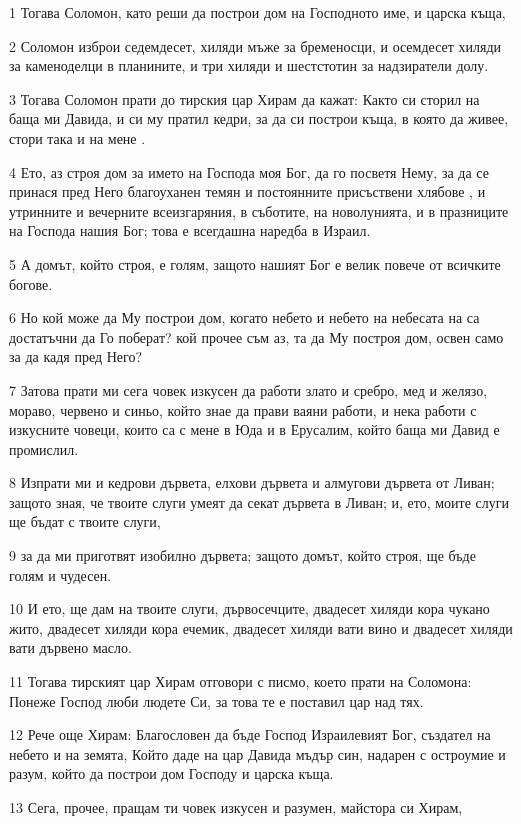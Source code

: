 \par 1 Тогава Соломон, като реши да построи дом на Господното име, и царска къща,
\par 2 Соломон изброи седемдесет, хиляди мъже за бременосци, и осемдесет хиляди за каменоделци в планините, и три хиляди и шестстотин за надзиратели долу.
\par 3 Тогава Соломон прати до тирския цар Хирам да кажат: Както си сторил на баща ми Давида, и си му пратил кедри, за да си построи къща, в която да живее, стори така и на мене .
\par 4 Ето, аз строя дом за името на Господа моя Бог, да го посветя Нему, за да се принася пред Него благоуханен темян и постоянните присъствени хлябове , и утринните и вечерните всеизгаряния, в съботите, на новолунията, и в празниците на Господа нашия Бог; това е всегдашна наредба в Израил.
\par 5 А домът, който строя, е голям, защото нашият Бог е велик повече от всичките богове.
\par 6 Но кой може да Му построи дом, когато небето и небето на небесата на са достатъчни да Го поберат? кой прочее съм аз, та да Му построя дом, освен само за да кадя пред Него?
\par 7 Затова прати ми сега човек изкусен да работи злато и сребро, мед и желязо, мораво, червено и синьо, който знае да прави ваяни работи, и нека работи с изкусните човеци, които са с мене в Юда и в Ерусалим, който баща ми Давид е промислил.
\par 8 Изпрати ми и кедрови дървета, елхови дървета и алмугови дървета от Ливан; защото зная, че твоите слуги умеят да секат дървета в Ливан; и, ето, моите слуги ще бъдат с твоите слуги,
\par 9 за да ми приготвят изобилно дървета; защото домът, който строя, ще бъде голям и чудесен.
\par 10 И ето, ще дам на твоите слуги, дървосечците, двадесет хиляди кора чукано жито, двадесет хиляди кора ечемик, двадесет хиляди вати вино и двадесет хиляди вати дървено масло.
\par 11 Тогава тирският цар Хирам отговори с писмо, което прати на Соломона: Понеже Господ люби людете Си, за това те е поставил цар над тях.
\par 12 Рече още Хирам: Благословен да бъде Господ Израилевият Бог, създател на небето и на земята, Който даде на цар Давида мъдър син, надарен с остроумие и разум, който да построи дом Господу и царска къща.
\par 13 Сега, прочее, пращам ти човек изкусен и разумен, майстора си Хирам,
